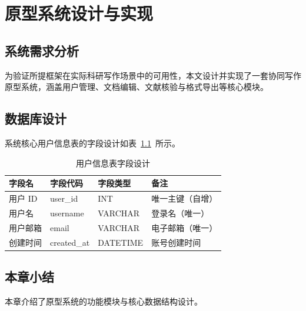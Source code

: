 \chapter{原型系统设计与实现}
\label{chap:system}

\section{系统需求分析}
为验证所提框架在实际科研写作场景中的可用性，本文设计并实现了一套协同写作原型系统，涵盖用户管理、文档编辑、文献核验与格式导出等核心模块。

\section{数据库设计}
系统核心用户信息表的字段设计如表~\ref{tab:user}~所示。

\begin{table}[htbp]
  \centering
  \caption{用户信息表字段设计}
  \label{tab:user}
  \begin{tabular}{llll}
    \toprule
    字段名 & 字段代码 & 字段类型 & 备注 \\
    \midrule
    用户 ID & user\_id & INT & 唯一主键（自增） \\
    用户名 & username & VARCHAR & 登录名（唯一） \\
    用户邮箱 & email & VARCHAR & 电子邮箱（唯一） \\
    创建时间 & created\_at & DATETIME & 账号创建时间 \\
    \bottomrule
  \end{tabular}
\end{table}

\section{本章小结}
本章介绍了原型系统的功能模块与核心数据结构设计。
